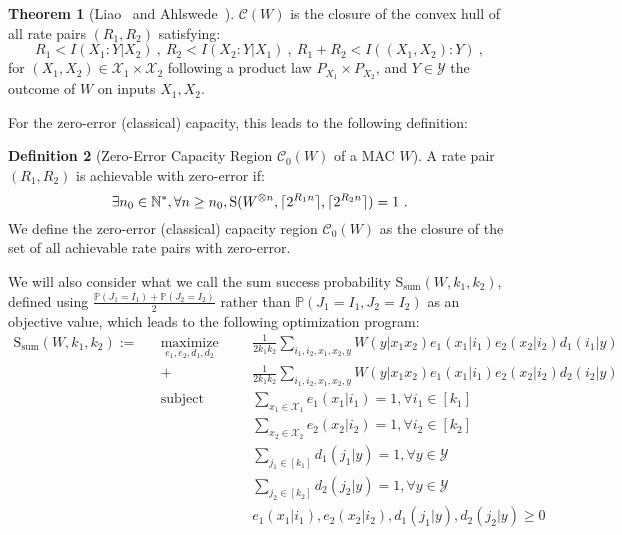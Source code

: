 \documentclass[11pt]{article}
\theoremstyle{definition}
\newtheorem{theo}{Theorem}[section]
\newtheorem{defi}[theo]{Definition}
\theoremstyle{remark}
\DeclareMathOperator{\maxi}{\text{maximize}}
\DeclareMathOperator{\st}{\text{subject to}}
\DeclarePairedDelimiter\ceil{\lceil}{\rceil}
\begin{document}
\begin{theo}[Liao~\cite{Liao73} and Ahlswede~\cite{Ahlswede73}]
  \label{theo:capacity}
  $\mathcal{C}(W)$ is the closure of the convex hull of all rate pairs $(R_1,R_2)$ satisfying:
  \[ R_1 < I(X_1:Y|X_2)\ ,\ R_2 < I(X_2:Y|X_1)\ ,\ R_1+R_2 < I((X_1,X_2):Y) \ ,\]
  for $(X_1,X_2) \in \mathcal{X}_1 \times \mathcal{X}_2$ following a product law $P_{X_1} \times P_{X_2}$, and $Y \in \mathcal{Y}$ the outcome of $W$ on inputs $X_1,X_2$.
\end{theo}

For the zero-error (classical) capacity, this leads to the following definition:
\begin{defi}[Zero-Error Capacity Region $\mathcal{C}_0(W)$ of a MAC $W$]
  A rate pair $(R_1,R_2)$ is achievable with zero-error if:
  \[ \exists n_0  \in \mathbb{N}^*, \forall n \geq n_0, \mathrm{S}(W^{\otimes n},\ceil{2^{R_1n}},\ceil{2^{R_2n}}) = 1 \ . \]
  We define the zero-error (classical) capacity region $\mathcal{C}_0(W)$ as the closure of the set of all achievable rate pairs with zero-error.
\end{defi}

We will also consider what we call the sum success probability $\mathrm{S}_{\text{sum}}(W,k_1,k_2)$, defined using $\frac{\mathbb{P}\left(J_1=I_1\right)+\mathbb{P}\left(J_2=I_2\right)}{2}$ rather than $\mathbb{P}\left(J_1=I_1,J_2=I_2\right)$ as an objective value, which leads to the following optimization program:
\begin{equation}
  \begin{aligned}
    \mathrm{S}_{\text{sum}}(W,k_1,k_2) := &&\underset{e_1,e_2,d_1,d_2}{\maxi} &&& \frac{1}{2k_1k_2} \sum_{i_1,i_2,x_1,x_2,y} W(y|x_1x_2)e_1(x_1|i_1)e_2(x_2|i_2)d_1(i_1|y)\\
    &&+&&& \frac{1}{2k_1k_2} \sum_{i_1,i_2,x_1,x_2,y} W(y|x_1x_2)e_1(x_1|i_1)e_2(x_2|i_2)d_2(i_2|y)\\
    &&\st &&& \sum_{x_1 \in \mathcal{X}_1} e_1(x_1|i_1) = 1, \forall i_1 \in [k_1]\\
    &&&&&  \sum_{x_2 \in \mathcal{X}_2} e_2(x_2|i_2) = 1, \forall i_2 \in [k_2]\\
    &&&&& \sum_{j_1 \in [k_1]} d_1(j_1|y) = 1, \forall y \in \mathcal{Y}\\
    &&&&& \sum_{j_2 \in [k_2]} d_2(j_2|y) = 1, \forall y \in \mathcal{Y}\\
    &&&&& e_1(x_1|i_1), e_2(x_2|i_2), d_1(j_1|y), d_2(j_2|y) \geq 0
  \end{aligned}
\end{equation}
\end{document}
